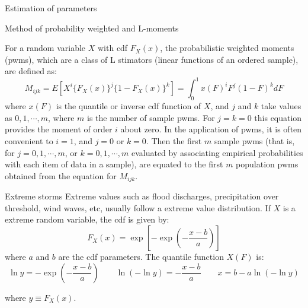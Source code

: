 \documentclass[8pt]{beamer}
\renewcommand{\emph}[1]{\textcolor{myorange}{#1}}
\begin{document}
\begin{frame}{Estimation of parameters}

    \begin{block}{Method of probability weighted and L-moments}

        For a random variable $X$ with \emph{cdf} $F_X (x)$, the \alert{probabilistic weighted moments (pwms)}, which are a class of \emph{L stimators} (linear functions of an ordered sample), are defined as:
        \[
            M_{ijk} = E \left[ X^i \{F_X (x)\}^j \{1 - F_X (x) \}^k \right] = \int_0^1 {x(F)}^i F^j (1 - F)^k dF
        \]
        where $x(F)$ is the quantile or inverse \emph{cdf} function of $X$, and $j$ and $k$ take values as  $0, 1, \cdots, m$, where $m$ is the number of sample \emph{pwms}. For $j=k=0$ this equation provides the moment of order $i$ about zero. In the application of \emph{pwms}, it is often convenient to $i=1$, and $j=0$ or $k=0$. Then the first $m$ sample \emph{pwms} (that is, for $j = 0, 1, \cdots, m$, or $k = 0, 1, \cdots, m$ evaluated by associating empirical probabilities with each item of data in a sample), are equated to the first $m$ population \emph{pwms} obtained from the equation for $M_{ijk}$.
    \end{block}
        \vspace{-6pt}
    \begin{exampleblock}{Extreme storms}
        Extreme values such as flood discharges, precipitation over threshold, wind waves, etc, usually follow a \emph{extreme value distribution}. If $X$ is a extreme random variable, the \emph{cdf} is given by:
        \vspace{-5pt}
        \[
            F_X (x) = \exp \left[ -\exp\left( - \frac{x-b}{a}\right)\right]
        \]
        \vspace{-5pt}
        where $a$ and $b$ are the \emph{cdf} parameters. The quantile function $X(F)$ is:
    \[
            \ln y = -\exp\left( - \frac{x-b}{a}\right) \quad \quad \ln( -\ln y) = -\frac{x-b}{a} \quad \quad x = b - a\ln( -\ln y)
        \]
        \vspace{-5pt}

        where $y\equiv F_X (x)$. 
    \end{exampleblock}

\end{frame}
\end{document}
